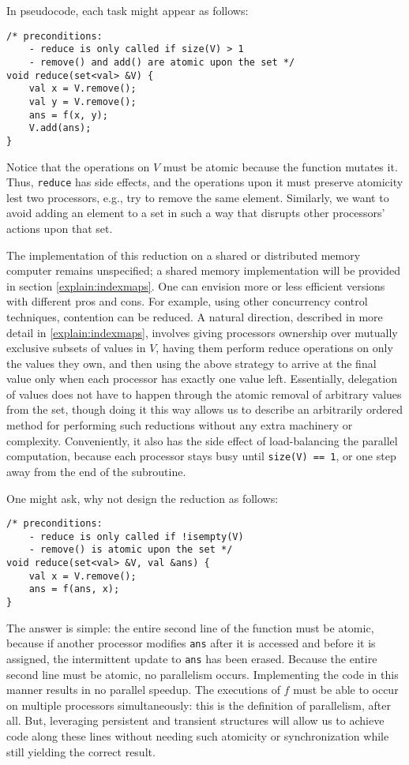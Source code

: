 In pseudocode, each task might appear as follows:
\begin{lstlisting}
/* preconditions: 
    - reduce is only called if size(V) > 1
    - remove() and add() are atomic upon the set */
void reduce(set<val> &V) {
    val x = V.remove();
    val y = V.remove();
    ans = f(x, y);
    V.add(ans);
}
\end{lstlisting}

Notice that the operations on $V$ must be atomic because the function mutates
it.  Thus, \texttt{reduce} has side effects, and the operations upon it must
preserve atomicity lest two processors, e.g., try to remove the same element.
Similarly, we want to avoid adding an element to a set in such a way that
disrupts other processors' actions upon that set.

The implementation of this reduction on a shared or distributed memory computer
remains unspecified; a shared memory implementation will be provided in section
\ref{explain:indexmaps}. One can envision more or less efficient versions with
different pros and cons. For example, using other concurrency control
techniques, contention can be reduced. A natural direction, described in more
detail in \ref{explain:indexmaps}, involves giving processors ownership over
mutually exclusive subsets of values in $V$, having them perform reduce
operations on only the values they own, and then using the above strategy to
arrive at the final value only when each processor has exactly one value left.
Essentially, delegation of values does not have to happen through the atomic
removal of arbitrary values from the set, though doing it this way allows us to
describe an arbitrarily ordered method for performing such reductions without
any extra machinery or complexity. Conveniently, it also has the side effect of
load-balancing the parallel computation, because each processor stays busy until
\texttt{size(V) == 1}, or one step away from the end of the subroutine.

One might ask, why not design the reduction as follows:
\begin{lstlisting}
/* preconditions: 
    - reduce is only called if !isempty(V)
    - remove() is atomic upon the set */
void reduce(set<val> &V, val &ans) {
    val x = V.remove();
    ans = f(ans, x);
}
\end{lstlisting}

The answer is simple: the entire second line of the function must be atomic,
because if another processor modifies \texttt{ans} after it is accessed and
before it is assigned, the intermittent update to \texttt{ans} has been erased.
Because the entire second line must be atomic, no parallelism occurs.
Implementing the code in this manner results in no parallel speedup. The
executions of $f$ must be able to occur on multiple processors simultaneously:
this is the definition of parallelism, after all. But, leveraging persistent and
transient structures will allow us to achieve code along these lines without
needing such atomicity or synchronization while still yielding the correct
result.

